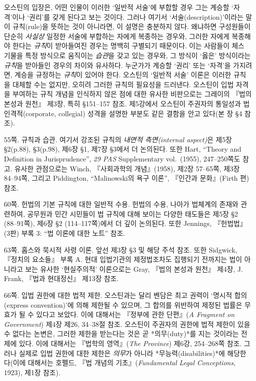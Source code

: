 {오스틴의 입장은, 어떤 인물이 이러한 `일반적 서술'에 부합할 경우 그는
계승할 `자격'이나 `권리'를 갖게 된다고 보는 것이다. 그러나 여기서
`서술(description)'이라는 말이 규칙(rule)을 뜻하는 것이 아니라면, 이
설명은 충분하지 않다. 왜냐하면 구성원들이 단순히 \emph{사실상} 일정한
서술에 부합하는 자에게 복종하는 경우와, 그러한 자에게 복종해야 한다는
\emph{규칙}이 받아들여진 경우는 명백히 구별되기 때문이다. 이는 사람들이
체스 기물을 특정 방식으로 움직이는 \emph{습관}을 갖고 있는 경우와, 그
방식이 `옳은' 방식이라는 \emph{규칙}을 받아들인 경우의 차이와 유사하다.
누군가가 계승할 `권리' 또는 `자격'을 가지려면, 계승을 규정하는
\emph{규칙}이 있어야 한다. 오스틴의 `일반적 서술' 이론은 이러한 규칙을
대체할 수는 없지만, 오히려 그러한 규칙의 필요성을 드러낸다. 오스틴이
입법 자격을 부여하는 규칙 개념을 인식하지 않은 점에 대한 유사한
비판으로는 그레이의 『법의 본성과 원천』 제3장, 특히 §151--157 참조.
제5강에서 오스틴이 주권자의 통일성과 법인격적(corporate, collegial)
성격을 설명한 부분도 같은 결함을 안고 있다(본 장 §4 참조).

55쪽. 규칙과 습관. 여기서 강조된 규칙의 \emph{내면적 측면(internal
aspect)}은 제5장 §2(p.88), §3(p.98), 제6장 §1, 제7장 §3에서 더 논의된다.
또한 Hart, ``Theory and Definition in Jurisprudence'', \emph{29 PAS}
Supplementary vol.~(1955), 247--250쪽도 참고. 유사한 관점으로는 Winch,
『사회과학의 개념』(1958), 제2장 57--65쪽, 제3장 84--94쪽, 그리고
Piddington, ``Malinowski의 욕구 이론'', 『인간과 문화』(Firth 편) 참조.

60쪽. 헌법의 기본 규칙에 대한 일반적 수용. 헌법의 수용, 나아가 법체계의
존재와 관련하여, 공무원과 민간 시민들이 법 규칙에 대해 보이는 다양한
태도들은 제5장 §2 (88--91쪽), 제6장 §2 (114--117쪽)에서 더 깊이
논의된다. 또한 Jennings, 『헌법법』(3판) 부록 3: ``법 이론에 대한 노트''
참조.

63쪽. 홉스와 묵시적 사령 이론. 앞선 제3장 §3 및 해당 주석 참조. 또한
Sidgwick, 『정치의 요소들』 부록 A. 현대 입법기관의 제정법조차도
집행되기 전까지는 법이 아니라고 보는 유사한 `현실주의적' 이론으로는
Gray, 『법의 본성과 원천』 제4장, J. Frank, 『법과 현대정신』 제13장
참조.

66쪽. 입법 권한에 대한 법적 제한. 오스틴과는 달리 벤담은 최고 권력이
`명시적 합의(express convention)'에 의해 제한될 수 있으며, 그 합의를
위반하여 제정된 법률은 무효가 될 수 있다고 보았다. 이에 대해서는
『정부에 관한 단편』(\emph{A Fragment on Government}) 제4장 제26,
34--38절 참조. 오스틴이 주권자의 권한에 법적 제한이 있을 수 없다는
논변은, 그러한 제한을 받는다는 것은 곧 *의무(duty)*를 지는 것이라는
전제에 있다. 이에 대해서는 『법학의 영역』(\emph{The Province}) 제6강,
254--268쪽 참조. 그러나 실제로 입법 권한에 대한 제한은 \emph{의무}가
아니라 *무능력(disabilities)*에 해당한다(이에 대해서는 호펠드, 『법
개념의 기초』(\emph{Fundamental Legal Conceptions}, 1923), 제1장 참조).

}

